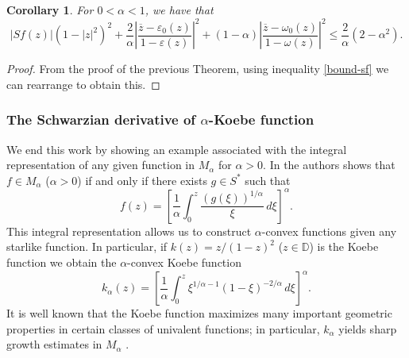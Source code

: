 \documentclass[reqno]{amsart}
\theoremstyle{plain}
\newtheorem{coro}[theo]{Corollary}
\theoremstyle{definition}
\newcommand{\D}{\mathbb{D}}
\begin{document}
\begin{coro} For $0<\alpha<1$, we have that
\begin{equation*}|Sf(z)|(1-|z|^2)^2+ \frac{2}{\alpha}\left|\frac{\overline z-\varepsilon_0(z)}{1-\varepsilon(z)}\right|^2+(1-\alpha)\left|\frac{\overline z-\omega_0(z)}{1-\omega(z)}\right|^2\leq \dfrac{2}{\alpha}(2-\alpha^2).\end{equation*}
\end{coro}

\begin{proof} From the proof of the previous Theorem, using inequality \eqref{bound-sf} we can rearrange to obtain this.
\end{proof}

\subsubsection{The Schwarzian derivative of $\alpha$-Koebe function}

We end this work by showing an example associated with the integral representation of any given function in $M_\alpha$ for $\alpha>0$. In \cite{MMR1974} the authors shows that $f\in M_\alpha$ ($\alpha>0$) if and only if there exists $g\in S^*$ such that
\begin{equation}
    f(z)=\left[\dfrac{1}{\alpha}\int_0^z\dfrac{(g(\xi))^{1/\alpha}}{\xi}\,d\xi\right]^\alpha.
\end{equation}
This integral representation allows us to construct $\alpha$-convex functions given any starlike function. In particular, if $k(z)=z/(1-z)^2$ ($z\in \D$) is the Koebe function we obtain the $\alpha$-convex Koebe function
\begin{equation}
    k_\alpha(z)=\left[\dfrac{1}{\alpha}\int_0^z \xi^{1/\alpha-1}(1-\xi)^{-2/\alpha}\,d\xi\right]^{\alpha}.
\end{equation}
It is well known that the Koebe function maximizes many important geometric properties in certain classes of univalent functions; in particular, $k_\alpha$ yields sharp growth estimates in $M_\alpha$ \cite{M1973}.
\end{document}
